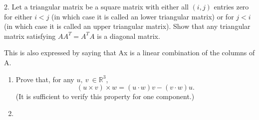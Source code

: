 \documentclass[12pt,a4paper]{article}
\begin{document}
	
	

	
	
	2. Let a triangular matrix be a square matrix with either all $(i,j)$ entries zero for either $i<j$ 
	(in which case it is called an lower triangular matrix) or for $j<i$ (in which case it is called an upper triangular matrix). 
	Show that any triangular matrix satisfying $AA^T = A^TA$ is a diagonal matrix.
	
	
	
	
	This is also expressed by saying that Ax is a linear combination of the columns of A.


	\begin{enumerate}
		\item Prove that, for any $u,\:v\:\in\mathbb{R}^3$, %
		$$(u\times v)\times w= (u\cdot w)v - (v\cdot w)u.$$
		(It is sufficient to verify this property for one component.)
		\item
	
	\end{enumerate}

	
	

	
\end{document}
